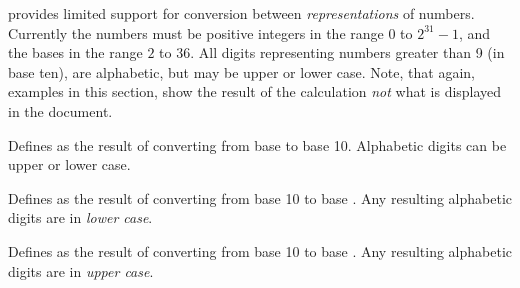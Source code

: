 \label{pgfmath-bases}

\pgfname{} provides limited support for conversion between 
\emph{representations} of numbers. Currently the numbers must be
positive integers in the range $0$ to $2^{31}-1$, and the bases in the
range $2$ to $36$. All digits representing numbers greater than 9 (in
base ten), are alphabetic, but may be upper or lower case. Note, that
again, examples in this section, show the result of the calculation
\emph{not} what is displayed in the document.

\begin{command}{\pgfmathbasetodec{}}
	Defines  as the result of converting  from
	base  to base 10. Alphabetic digits can be upper or lower
	case.

\medskip

\end{command}

\begin{command}{\pgfmathdectobase{}}
	Defines  as the result of converting  from
	base 10 to base . Any resulting alphabetic digits are in
	\emph{lower case}.
	
\begin{codeexample}[post=\tt\footnotesize\mynumber]
\pgfmathdectobase{}
\end{codeexample}

\end{command}

\begin{command}{\pgfmathdectoBase{}}
	Defines  as the result of converting  from
	base 10 to base . Any resulting alphabetic digits are in
	\emph{upper case}.
	
\begin{codeexample}[post=\tt\footnotesize\mynumber]
\pgfmathdectoBase{}
\end{codeexample}

\end{command}

